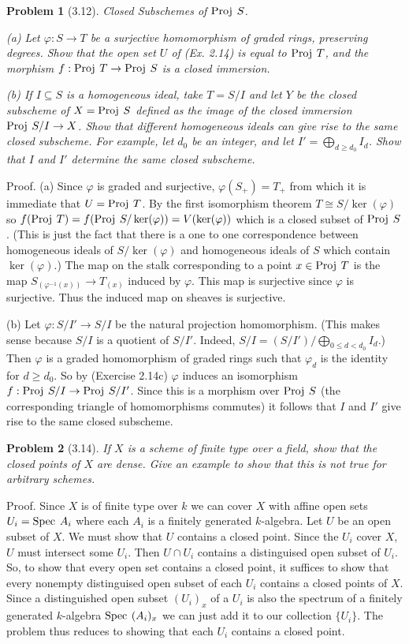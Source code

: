 \documentclass[12pt]{article}
\newtheorem{prob}{Problem}
\renewcommand{\phi}{\varphi}
\newcommand{\proj}{\mbox{\rm Proj \hspace{.01in}}}
\newcommand{\spec}{\mbox{\rm Spec \hspace{.01in}}}
\newcommand{\proof}{\mbox{\sc Proof.\hspace{.1in}}}
\begin{document}
\begin{prob}[3.12]
Closed Subschemes of $\proj S$.

(a) Let $\phi:S\rightarrow T$ be a surjective homomorphism of graded
rings, preserving degrees. Show that the open set $U$ of (Ex. 2.14)
is equal to $\proj T$, and the morphism $f:\proj T\rightarrow\proj S$
is a closed immersion.  

(b) If $I\subseteq S$ is a homogeneous ideal, take $T=S/I$ and let $Y$
be the closed subscheme of $X=\proj S$ defined as the image of the
closed immersion $\proj S/I\rightarrow X$. Show that different homogeneous
ideals can give rise to the same closed subscheme. For example,
let $d_0$ be an integer, and let $I'=\bigoplus_{d\geq d_0} I_d$. Show
that $I$ and $I'$ determine the same closed subscheme. 
\end{prob}
\proof
(a) Since $\phi$ is graded and surjective, $\phi(S_{+})=T_{+}$ from which
it is immediate that $U=\proj T$. By the first isomorphism theorem
$T\cong S/\ker(\phi)$ so $f(\proj T)=f(\proj S/\ker(\phi))
=V(\ker(\phi))$ which is a closed subset of $\proj S$. (This is
just the fact that there is a one to one correspondence between
homogeneous ideals of $S/\ker(\phi)$ and homogeneous ideals of $S$ 
which contain $\ker(\phi)$.) The map on the stalk corresponding
to a point $x\in\proj T$ is the map 
$S_{(\phi^{-1}(x))}\rightarrow T_{(x)}$
induced by $\phi$. This map is surjective since $\phi$ is surjective.
Thus the induced map on sheaves is surjective.   

(b) Let $\phi:S/I'\rightarrow S/I$ be the natural projection homomorphism.  
(This makes sense because $S/I$ is a quotient of $S/I'$. Indeed,
$S/I=(S/I')/\bigoplus_{0\leq d<d_0}I_d$.) Then $\phi$ is a graded homomorphism
of graded rings such that $\phi_d$ is the identity for $d\geq d_0$.
So by (Exercise 2.14c) $\phi$ induces an isomorphism
$f:\proj S/I \rightarrow \proj S/I'$. Since this is a morphism
over $\proj S$ (the corresponding triangle of homomorphisms commutes)
it follows that $I$ and $I'$ give rise to the same closed subscheme. 

\begin{prob}[3.14]
If $X$ is a scheme of finite type over a field, show that
the closed points of $X$ are dense. Give an example to show that
this is not true for arbitrary schemes.
\end{prob}
\proof
Since $X$ is of finite type over $k$ we can cover $X$ with
affine open sets $U_i=\spec A_i$ where each $A_i$ is a finitely
generated $k$-algebra. Let $U$ be an open subset of $X$. We must
show that $U$ contains a closed point. Since the $U_i$ cover
$X$, $U$ must intersect some $U_i$. Then $U\cap U_i$ contains
a distinguised open subset of $U_i$. So, to show that every open
set contains a closed point, it suffices to show that every 
nonempty distinguised open subset of each $U_i$ contains 
a closed points of $X$. Since a distinguished open subset $(U_i)_x$ of
a $U_i$ is also the spectrum of a finitely generated $k$-algebra
$\spec (A_i)_x$ we can just add it to our collection $\{U_i\}$. 
The problem thus reduces to showing that each $U_i$ contains
a closed point.
\end{document}
